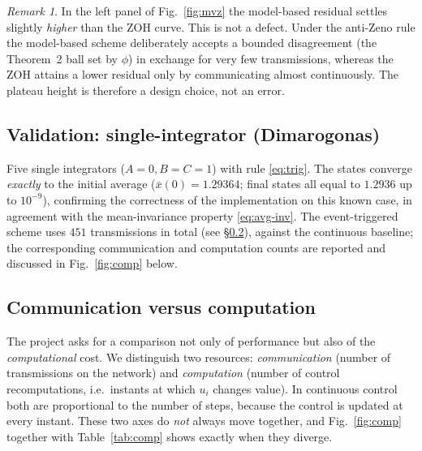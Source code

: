 \documentclass[11pt,a4paper]{article}
\theoremstyle{remark}
\newtheorem{remark}{Remark}
\begin{document}
\begin{remark}
In the left panel of Fig.~\ref{fig:mvz} the model-based residual settles slightly \emph{higher} than
the ZOH curve. This is not a defect. Under the anti-Zeno rule the model-based scheme deliberately
accepts a bounded disagreement (the Theorem~2 ball set by $\phi$) in exchange for very few
transmissions, whereas the ZOH attains a lower residual only by communicating almost continuously.
The plateau height is therefore a design choice, not an error.
\end{remark}

\subsection{Validation: single-integrator (Dimarogonas)}
Five single integrators ($A=0,B=C=1$) with rule \eqref{eq:trig}. The states converge \emph{exactly}
to the initial average ($\bar x(0)=1.29364$; final states all equal to $1.2936$ up to $10^{-9}$),
confirming the correctness of the implementation on this known case, in agreement with the
mean-invariance property \eqref{eq:avg-inv}. The event-triggered scheme uses $451$ transmissions in
total (see \S\ref{sec:comp}), against the continuous baseline; the corresponding communication and
computation counts are reported and discussed in Fig.~\ref{fig:comp} below.

\subsection{Communication versus computation}
\label{sec:comp}
The project asks for a comparison not only of performance but also of the \emph{computational} cost.
We distinguish two resources: \emph{communication} (number of transmissions on the network) and
\emph{computation} (number of control recomputations, i.e.\ instants at which $u_i$ changes value).
In continuous control both are proportional to the number of steps, because the control is updated at
every instant. These two axes do \emph{not} always move together, and Fig.~\ref{fig:comp} together
with Table~\ref{tab:comp} shows exactly when they diverge.
\end{document}
